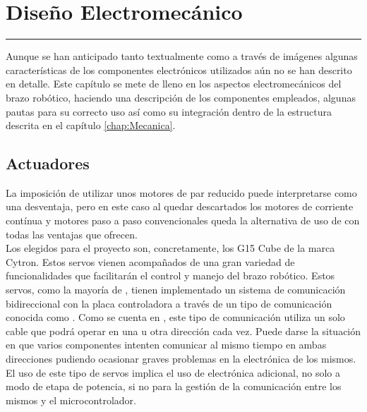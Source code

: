 \chapter{Diseño Electromecánico} \label{chap:Electronica}
\hrule
\vspace{3mm}

Aunque se han anticipado tanto textualmente como a través de imágenes algunas características de los componentes electrónicos utilizados aún no se han descrito en detalle. Este capítulo se mete de lleno en los aspectos electromecánicos del brazo robótico, haciendo una descripción de los componentes empleados, algunas pautas para su correcto uso así como su integración dentro de la estructura descrita en el capítulo \ref{chap:Mecanica}.

\section{Actuadores} \label{sec:Electronica:Actuadores}
\label{sec:Electronica:Actuadores:G15}

    La imposición de utilizar unos motores de par reducido puede interpretarse como una desventaja, pero en este caso al quedar descartados los motores de corriente contínua y motores paso a paso convencionales queda la alternativa de uso de  con todas las ventajas que ofrecen.
    \\

    Los  elegidos para el proyecto son, concretamente, los G15 Cube de la marca Cytron. Estos servos vienen acompañados de una gran variedad de funcionalidades que facilitarán el control y manejo del brazo robótico. Estos servos, como la mayoría de , tienen implementado un sistema de comunicación bidireccional con la placa controladora a través de un tipo de comunicación conocida como . Como se cuenta en \cite{embeddedSystems}, este tipo de comunicación utiliza un solo cable que podrá operar en una u otra dirección cada vez. Puede darse la situación en que varios componentes intenten comunicar al mismo tiempo en ambas direcciones pudiendo ocasionar graves problemas en la electrónica de los mismos. El uso de este tipo de servos implica el uso de electrónica adicional, no solo a modo de etapa de potencia, si no para la gestión de la comunicación entre los mismos y el microcontrolador.
    \\

